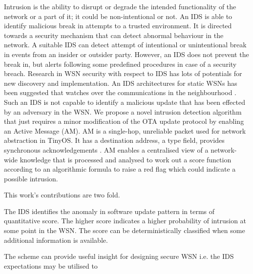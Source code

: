 \documentclass[conference,final]{IEEEtran}
\begin{document}



Intrusion is the ability to disrupt or degrade the intended functionality of the network or a part of it; it could be non-intentional or not.
An IDS is able to identify malicious break in attempts  to a trusted environment.
It is directed towards a security mechanism that can detect abnormal behaviour in the network.
A suitable IDS can detect attempt of intentional or unintentional break in events from an insider or outsider party.
However, an IDS does not prevent the break in, but alerts following some predefined procedures in case of a security breach.
Research in WSN security with respect to IDS has lots of potentials for new discovery and implementation.
An IDS architectures for static WSNs has been suggested that watches over the communications in the neighbourhood \cite{roman2006applying}.
Such an IDS is not capable to identify a malicious update that has been effected by an adversary in the WSN.
We propose a novel intrusion detection algorithm that just requires a minor modification of the OTA update protocol by enabling an Active Message (AM). AM is  a single-hop, unreliable packet used for network abstraction in TinyOS. It has a destination address, a type field, provides synchronous acknowledgements \cite{tep116}.
AM enables a centralised view of a network-wide knowledge  that is processed and analysed to work out a score function according to an algorithmic formula to raise a red flag which could indicate a possible intrusion.



This work's contributions are two fold.
\begin{inparaenum}
\item The IDS identifies the anomaly in software update pattern in terms of quantitative score. The higher score indicates a higher probability of intrusion at some point in the WSN. The score can be deterministically classified when some additional information is available.
\item The scheme can provide useful insight for designing secure WSN i.e. the IDS expectations may be utilised to 
\end{inparaenum}
\end{document}
